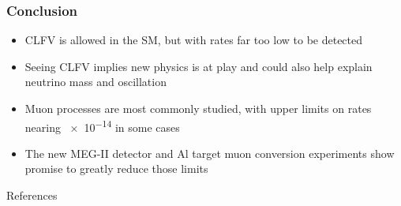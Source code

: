 \documentclass[11pt]{beamer}
\begin{document}
\begin{frame}
    \frametitle{Conclusion}
    \begin{itemize}
        \item CLFV is allowed in the SM, but with rates far too low to be detected
        \item Seeing CLFV implies new physics is at play and could also help explain neutrino mass and oscillation
        \item Muon processes are most commonly studied, with upper limits on rates nearing \num{e-14} in some cases
        \item The new MEG-II detector and Al target muon conversion experiments show promise to greatly reduce those limits
    \end{itemize}
    

\end{frame}

\begin{frame}[allowframebreaks]{References} 
    \nocite{*}
    
    
\end{frame}
\end{document}
